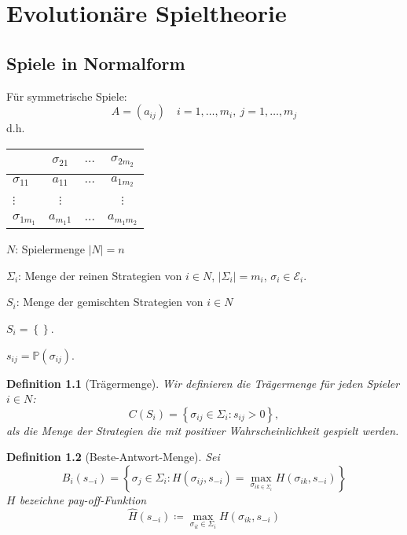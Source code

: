 \documentclass[12pt]{extreport} %
\theoremstyle{named}
\theoremstyle{itshape}
\newtheorem*{definition}{Definition}
\theoremstyle{normal}
\begin{document}
\chapter{Evolutionäre Spieltheorie}

  
\section{Spiele in Normalform}
Für symmetrische Spiele:
$$ A = \left( a_{ij} \right) \quad i = 1, \dotsc, m_{i}, ~ j = 1, \dotsc, m_{j} $$
d.h.
\begin{figure*}[h!] \centering
 \begin{tabular}{l|ccc}
   ~                & $\sigma_{21}$ & $\dotsc$  & $\sigma_{2 m_{2}} $\\
  \hline
  $\sigma_{11}$     &  $a_{11}$     & $\dotsc$  & $a_{1m_{2}}$ \\
  $\vdots$          & $\vdots$      & ~         & $\vdots$ \\
  $\sigma_{1m_{1}}$ & $a_{m_{1} 1}$ & $\dotsc $ & $a_{m_{1} m_{2}}$
 \end{tabular}	
\end{figure*}

\begin{description}
	\item $N$: Spielermenge $|N| = n$
	\item $\Sigma_{i}$: Menge der reinen Strategien von $i \in N$, $\left| \Sigma_{i} \right| = m_{i}$, $\sigma_{i} \in \mathcal{E}_{i}$.
	\item $S_{i}$: Menge der gemischten Strategien von $i \in N$
		\begin{description}
			\item $S_{i} = \left\{ \right\}$.
			\item $s_{ij} = \mathds{P}(\sigma_{ij})$.
		\end{description}
\end{description}
  
\begin{definition}[Trägermenge] Wir definieren die Trägermenge für jeden Spieler $i \in N$:
	$$ C(S_{i}) = \left\{ \sigma_{ij} \in \Sigma_{i} : s_{ij} > 0 \right\}, $$
	als die Menge der Strategien die mit positiver Wahrscheinlichkeit gespielt werden.
\end{definition}  

\begin{definition}[Beste-Antwort-Menge] Sei
	$$ B_{i}(s_{-i}) = \left\{ \sigma_{j} \in \Sigma_{i} : H(\sigma_{ij}, s_{-i}) = \max_{\sigma_{ik \in \Sigma_{i}}} H(\sigma_{ik}, s_{-i}) \right\} $$ 
	$H$ bezeichne pay-off-Funktion ~\\
	$$ \hat{H}(s_{-i}) \coloneqq \max_{\sigma_{il} \in \Sigma_{i}} H(\sigma_{ik}, s_{-i}) $$
\end{definition}
  
\end{document}
